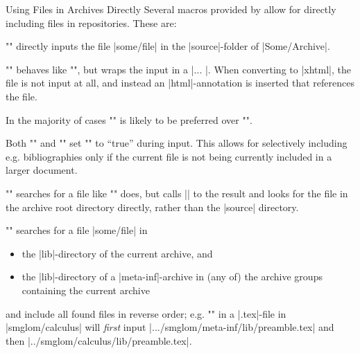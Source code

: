\begin{sfragment}{Using Files in \sTeX Archives Directly}
    Several macros provided by \sTeX allow for directly including
    files in repositories. These are:
    \begin{function}{\mhinput}
        \stexcode"" directly
        inputs the file |some/file| in the |source|-folder of
        |Some/Archive|.
    \end{function}
    \begin{function}{}
        \stexcode"" behaves
        like \stexcode"\mhinput", but wraps the input in
        a |\begingroup ... \endgroup|. When converting
        to |xhtml|, the file is not input at all, and instead
        an |html|-annotation is inserted that references the file.

        In the majority of cases \stexcode"" is likely
        to be preferred over \stexcode"\mhinput".
    \end{function}
    \begin{function}{\ifinput}
        Both \stexcode"\mhinput" and \stexcode""
        set \stexcode"\ifinput" to ``true'' during input. This allows
        for selectively including e.g. bibliographies only if the
        current file is not being currently included in a larger document.
    \end{function}
    \begin{function}{\addmhbibresource}
        \stexcode""
        searches for a file like \stexcode"\mhinput" does,
        but calls || to the result and looks for the
        file in the archive root directory directly, rather than the
        |source| directory.
    \end{function}
    \begin{function}{\libinput}
        \stexcode"" 
        searches for a file |some/file| in
        \begin{itemize}
            \item the |lib|-directory of the current archive, and
            \item the |lib|-directory of a |meta-inf|-archive in
                (any of) the archive groups containing the current archive
        \end{itemize}
        and include all found files in reverse order; 
        e.g. \stexcode"" in a |.tex|-file in
        |smglom/calculus| will \emph{first} input |.../smglom/meta-inf/lib/preamble.tex|
        and then |../smglom/calculus/lib/preamble.tex|.


\end{function}
\end{sfragment}
